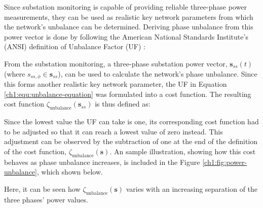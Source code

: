 
Since substation monitoring is capable of providing reliable three-phase power measurements, they can be used as realistic key network parameters from which the network's unbalance can be determined.
Deriving phase unbalance from this power vector is done by following the American National Standards Institute's (ANSI) definition of Unbalance Factor (UF) \cite{ANSI-MB-1-2011}:




From the substation monitoring, a three-phase substation power vector, $\textbf{s}_{ss}(t)$ (where $s_{ss,\phi} \in \textbf{s}_{ss}$), can be used to calculate the network's phase unbalance.
Since this forms another realistic key network parameter, the UF in Equation \ref{ch1:equ:unbalance-equation} was formulated into a cost function.
The resulting cost function $\zeta_\text{unbalance}(\textbf{s}_{ss})$ is thus defined as:



Since the lowest value the UF can take is one, its corresponding cost function had to be adjusted so that it can reach a lowest value of zero instead.
This adjustment can be observed by the subtraction of one at the end of the definition of the cost function, $\zeta_\text{unbalance}(\textbf{s})$.
An sample illustration, showing how this cost behaves as phase unbalance increases, is included in the Figure \ref{ch1:fig:power-unbalance}, which shown below.



Here, it can be seen how $\zeta_\text{unbalance}(\textbf{s})$ varies with an increasing separation of the three phases' power values.



